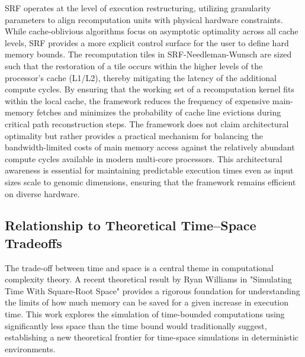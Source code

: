 SRF operates at the level of execution restructuring, utilizing granularity parameters to align recomputation units with physical hardware constraints. While cache-oblivious algorithms focus on asymptotic optimality across all cache levels, SRF provides a more explicit control surface for the user to define hard memory bounds. The recomputation tiles in SRF-Needleman-Wunsch are sized such that the restoration of a tile occurs within the higher levels of the processor's cache (L1/L2), thereby mitigating the latency of the additional compute cycles. By ensuring that the working set of a recomputation kernel fits within the local cache, the framework reduces the frequency of expensive main-memory fetches and minimizes the probability of cache line evictions during critical path reconstruction steps. The framework does not claim architectural optimality but rather provides a practical mechanism for balancing the bandwidth-limited costs of main memory access against the relatively abundant compute cycles available in modern multi-core processors. This architectural awareness is essential for maintaining predictable execution times even as input sizes scale to genomic dimensions, ensuring that the framework remains efficient on diverse hardware.

\subsection{Relationship to Theoretical Time--Space Tradeoffs}

The trade-off between time and space is a central theme in computational complexity theory. A recent theoretical result by Ryan Williams \cite{Williams2025} in "Simulating Time With Square-Root Space" provides a rigorous foundation for understanding the limits of how much memory can be saved for a given increase in execution time. This work explores the simulation of time-bounded computations using significantly less space than the time bound would traditionally suggest, establishing a new theoretical frontier for time-space simulations in deterministic environments.

